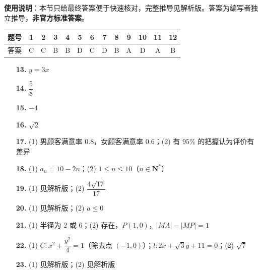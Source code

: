 
\begin{gknotice}
\textbf{使用说明}：本节只给最终答案便于快速核对，完整推导见解析版。答案为编写者独立推导，\textbf{非官方标准答案}。
\end{gknotice}

\begin{center}\begin{tabular}{ccccccccccccc}
\toprule
题号 & 1 & 2 & 3 & 4 & 5 & 6 & 7 & 8 & 9 & 10 & 11 & 12 \\
\midrule
答案 & C & C & B & B & D & C & D & B & A & D & A & B \\
\bottomrule
\end{tabular}\end{center}

\begin{itemize}[leftmargin=2.6em]
  \item[\textbf{13.}] $y=3x$
  \item[\textbf{14.}] $\dfrac58$
  \item[\textbf{15.}] $-4$
  \item[\textbf{16.}] $\sqrt2$
\end{itemize}

\begin{itemize}[leftmargin=2.6em]
  \item[\textbf{17.}] (1) 男顾客满意率 $0.8$，女顾客满意率 $0.6$；(2) 有 $95\%$ 的把握认为评价有差异
  \item[\textbf{18.}] (1) $a_n=10-2n$；(2) $1\le n\le10$（$n\in\mathbf N^{*}$）
  \item[\textbf{19.}] (1) 见解析版；(2) $\dfrac{4\sqrt{17}}{17}$
  \item[\textbf{20.}] (1) 见解析版；(2) $a\le0$
  \item[\textbf{21.}] (1) 半径为 $2$ 或 $6$；(2) 存在，$P(1,0)$，$|MA|-|MP|=1$
\end{itemize}

\begin{itemize}[leftmargin=2.6em]
  \item[\textbf{22.}] (1) $C:x^{2}+\dfrac{y^{2}}4=1$（除去点 $(-1,0)$）；$l:2x+\sqrt3y+11=0$；(2) $\sqrt7$
  \item[\textbf{23.}] (1) 见解析版；(2) 见解析版
\end{itemize}
